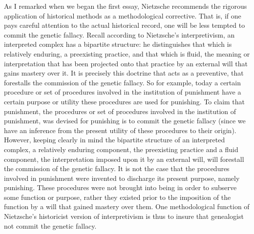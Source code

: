 As I remarked when we began the first essay, Nietzsche recommends the rigorous application of historical methods as a methodological corrective. That is, if one pays careful attention to the actual historical record, one will be less tempted to commit the genetic fallacy. Recall according to Nietzsche's interpretivism, an interpreted complex has a bipartite structure: he distinguishes that which is relatively enduring, a preexisting practice, and that which is fluid, the meaning or interpretation that has been projected onto that practice by an external will that gains mastery over it. It is precisely this doctrine that acts as a preventive, that forestalls the commission of the genetic fallacy. So for example, today a certain procedure or set of procedures involved in the institution of punishment have a certain purpose or utility these procedures are used for punishing. To claim that punishment, the procedures or set of procedures involved in the institution of punishment, was devised for punishing is to commit the genetic fallacy (since we have an inference from the present utility of these procedures to their origin). However, keeping clearly in mind the bipartite structure of an interpreted complex, a relatively enduring component, the preexisting practice and a fluid component, the interpretation imposed upon it by an external will, will forestall the commission of the genetic fallacy. It is not the case that the procedures involved in punishment were invented to discharge its present purpose, namely punishing. These procedures were not brought into being in order to subserve some function or purpose, rather they existed prior to the imposition of the function by a will that gained mastery over them. One methodological function of Nietzsche's historicist version of interpretivism is thus to insure that genealogist not commit the genetic fallacy. \change

